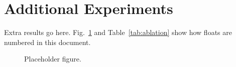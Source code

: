 \section{Additional Experiments}
\label{sec:experiments}

Extra results go here. Fig.~\ref{fig:placeholder} and Table~\ref{tab:ablation} show how floats are numbered in this document.

\begin{figure}[!t]
  \centering
  \caption{Placeholder figure.}
  \label{fig:placeholder}
\end{figure}


